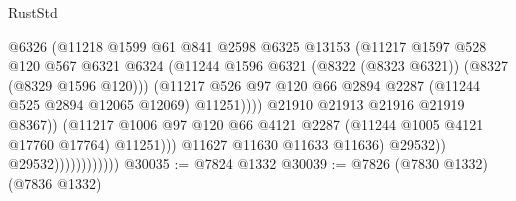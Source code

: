 \begin{lexlean}{RustStd}
\begin{coremodule}
{\begin{coremodule}
{{{{{{{{{{{{{{{{{{{{{{{{{{{{{{{{{{{{{{{{{{{{{{{{{{{{{{                                            @6326
                                            (@11218
                                              @1599
                                              @61
                                              @841
                                              @2598
                                              @6325
                                              @13153
                                              (@11217
                                                @1597
                                                @528
                                                @120
                                                @567
                                                @6321
                                                @6324
                                                (@11244
                                                  @1596
                                                  @6321
                                                  (@8322 (@8323 @6321))
                                                  (@8327 (@8329 @1596 @120)))
                                                (@11217
                                                  @526
                                                  @97
                                                  @120
                                                  @66
                                                  @2894
                                                  @2287
                                                  (@11244 @525 @2894 @12065 @12069)
                                                  @11251))))
                                          @21910
                                          @21913
                                          @21916
                                          @21919
                                          @8367))
                                      (@11217
                                        @1006
                                        @97
                                        @120
                                        @66
                                        @4121
                                        @2287
                                        (@11244 @1005 @4121 @17760 @17764)
                                        @11251)))
                                  @11627
                                  @11630
                                  @11633
                                  @11636)
                                @29532))
                            @29532))))))))))))
@30035 := @7824 @1332
@30039 := @7826 (@7830 @1332) (@7836 @1332)
}}}}}}}}}}}}}}}}}}}}}}}}}}}}}}}}}}}}}}}}}}}}}}}}}}}}}}
\end{coremodule}}
\end{coremodule}
\end{lexlean}
